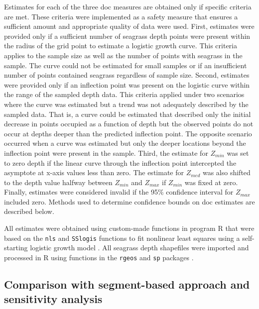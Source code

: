 \documentclass[letterpaper,12pt,oneside]{article}\usepackage[]{graphicx}\usepackage[]{color}
\begin{document}
Estimates for each of the three \ac{doc} measures are obtained only if specific criteria are met.  These criteria were implemented as a safety measure that ensures a sufficient amount and appropriate quality of data were used.  First, estimates were provided only if a sufficient number of seagrass depth points were present within the radius of the grid point to estimate a logistic growth curve.  This criteria applies to the sample size as well as the number of points with seagrass in the sample.  The curve could not be estimated for small samples or if an insufficient number of points contained seagrass regardless of sample size.  Second, estimates were provided only if an inflection point was present on the logistic curve within the range of the sampled depth data.  This criteria applied under two scenarios where the curve was estimated but a trend was not adequately described by the sampled data.  That is, a curve could be estimated that described only the initial decrease in points occupied as a function of depth but the observed points do not occur at depths deeper than the predicted inflection point.  The opposite scenario occurred when a curve was estimated but only the deeper locations beyond the inflection point were present in the sample.  Third, the estimate for $Z_{min}$ was set to zero depth if the linear curve through the inflection point intercepted the asymptote at x-axis values less than zero.  The estimate for $Z_{med}$ was also shifted to the depth value halfway between $Z_{min}$ and $Z_{max}$ if $Z_{min}$ was fixed at zero.  Finally, estimates were considered invalid if the 95\% confidence interval for $Z_{max}$ included zero.  Methods used to  determine confidence bounds on \ac{doc} estimates are described below.  

All estimates were obtained using custom-made functions in program R that were based on the \texttt{nls} and \texttt{SSlogis} functions to fit nonlinear least squares using a self-starting logistic growth model \citep{Bates92,RDCT14}.  All seagrass depth shapefiles were imported and processed in R using functions in the \texttt{rgeos} and \texttt{sp} packages \citep{Bivand08,Bivand14}.  

\subsection{Comparison with segment-based approach and sensitivity analysis}
\end{document}
